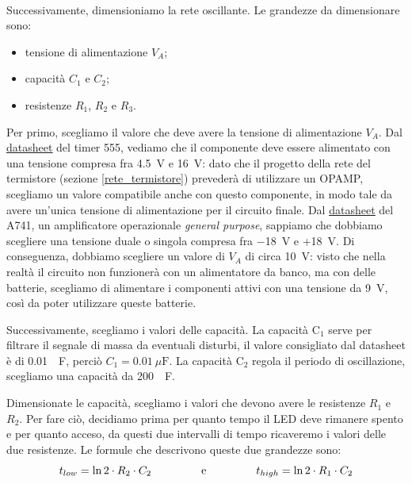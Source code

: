 \documentclass{report}
\begin{document}
\\Successivamente, dimensioniamo la rete oscillante. Le grandezze da dimensionare sono:
\begin{itemize}
\item tensione di alimentazione $V_A$;
\item capacità $C_1$ e $C_2$;
\item resistenze $R_1$, $R_2$ e $R_3$.
\end{itemize}
Per primo, scegliamo il valore che deve avere la tensione di alimentazione $V_A$. Dal \textcolor{blue}{\underline{\href{https://www.ti.com/lit/ds/symlink/lm555.pdf?ts=1667144089940&ref_url=https\%253A\%252F\%252Fwww.ti.com\%252Fproduct\%252FLM555}{datasheet}}} del timer 555, vediamo che il componente deve essere alimentato con una tensione compresa fra \SI{4.5}{\volt} e \SI{16}{\volt}: dato che il progetto della rete del termistore (sezione \ref{rete_termistore}) prevederà di utilizzare un OPAMP, scegliamo un valore compatibile anche con questo componente, in modo tale da avere un'unica tensione di alimentazione per il circuito finale. Dal \textcolor{blue}{\underline{\href{https://www.ti.com/lit/ds/symlink/ua741.pdf?ts=1672216941275&ref_url=https\%253A\%252F\%252Fwww.ti.com\%252Fproduct\%252FUA741}{datasheet}}} del \textmu A741, un amplificatore operazionale \textit{general purpose}, sappiamo che dobbiamo scegliere una tensione duale o singola compresa fra \SI{-18}{\volt} e +\SI{18}{\volt}. Di conseguenza, dobbiamo scegliere un valore di  $V_A$ di circa \SI{10}{\volt}: visto che nella realtà il circuito non funzionerà con un alimentatore da banco, ma con delle batterie, scegliamo di alimentare i componenti attivi con una tensione da \SI{9}{\volt}, così da poter utilizzare queste batterie. \par
Successivamente, scegliamo i valori delle capacità. La capacità $\mathrm{C_1}$ serve per filtrare il segnale di massa da eventuali disturbi, il valore consigliato dal datasheet è di \SI{0.01}{\mu\farad}, perciò $\displaystyle{C_1=\SI{0.01}{\mu\farad}}$. La capacità $\mathrm{C_2}$ regola il periodo di oscillazione, scegliamo una capacità da \SI{200}{\mu\farad}. \par
Dimensionate le capacità, scegliamo i valori che devono avere le resistenze $R_1$ e $R_2$. Per fare ciò, decidiamo prima per quanto tempo il LED deve rimanere spento e per quanto acceso, da questi due intervalli di tempo ricaveremo i valori delle due resistenze. Le formule che descrivono queste due grandezze sono:
\\$$t_{low}=\ln2\cdot R_2\cdot C_2\indent\indent\indent \mathrm{e}\indent\indent\indent t_{high}=\ln2\cdot R_1\cdot C_2$$
\end{document}
